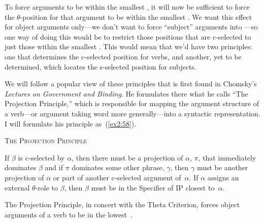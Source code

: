 To force arguments to be within the smallest , it will now be sufficient to force the \mbox{$\theta$-position} for that argument to be within the smallest . We want this effect for object arguments only---we don't want to force ``subject'' arguments into ---so one way of doing this would be to restrict those positions that are \mbox{c-selected} to just those within the smallest .%
%
%
%
This would mean that we'd have two principles: one that determines the \mbox{c-selected} position for verbs, and another, yet to be determined, which locates the \mbox{s-selected} position for subjects.

We will follow a popular view of these principles that is first found in Chomsky's \emph{Lectures on Government and Binding}. He formulates there what he calls ``The Projection Principle,'' which is responsible for mapping the argument structure of a verb---or argument taking word more generally---into a syntactic representation. I will formulate his principle as~(\ref{ex2:58}). 
\begin{exe}
	\ex \label{ex2:58} \textsc{The Projection Principle}
	\begin{xlist}
	\ex If $\beta$ is c-selected by $\alpha$, then there must be a projection of $\alpha$, $\pi$, that immediately dominates $\beta$ and if $\pi$ dominates some other phrase, $\gamma$, then $\gamma$ must be another projection of $\alpha$ or part of another c-selected argument of~$\alpha$.
	\ex If $\alpha$ assigns an external \mbox{$\theta$-role} to $\beta$, then $\beta$ must be in the Specifier of IP closest to~$\alpha$.
	\end{xlist}%
%
%
%
%
\end{exe}
The Projection Principle, in concert with the Theta Criterion, forces object arguments of a verb to be in the lowest~.

